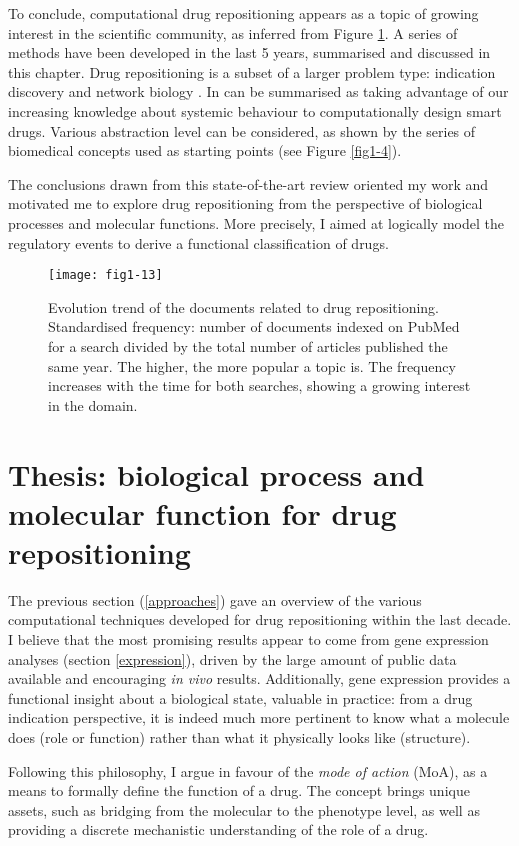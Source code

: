 To conclude, computational drug repositioning appears as a topic of growing interest in the scientific community, as inferred from Figure \ref{fig1-13}. A series of methods have been developed in the last 5 years, summarised and discussed in this chapter. Drug repositioning is a subset of a larger problem type: indication discovery and network biology \citep{hopkins2008network}. In can be summarised as taking advantage of our increasing knowledge about systemic behaviour to computationally design smart drugs.
Various abstraction level can be considered, as shown by the series of biomedical concepts used as starting points (see Figure \ref{fig1-4}).

The conclusions drawn from this state-of-the-art review oriented my work and motivated me to explore drug repositioning from the perspective of biological processes and molecular functions. More precisely, I aimed at logically model the regulatory events to derive a functional classification of drugs.

\begin{figure}[ht]
    \centering
    \texttt{[image: fig1-13]}
    \caption{Evolution trend of the documents related to drug repositioning. Standardised frequency: number of documents indexed on PubMed for a search divided by the total number of articles published the same year. The higher, the more popular a topic is. The  frequency increases with the time for both searches, showing a growing interest in the domain.}
    \label{fig1-13}
\end{figure}


\section{Thesis: biological process and molecular function for drug repositioning}

The previous section (\ref{approaches}) gave an overview of the various computational techniques developed for drug repositioning within the last decade. I believe that the most promising results appear to come from gene expression analyses (section \ref{expression}), driven by the large amount of public data available and encouraging \emph{in vivo} results. Additionally, gene expression provides a functional insight about a biological state, valuable in practice: from a drug indication perspective, it is indeed much more pertinent to know what a molecule does (role or function) rather than what it physically looks like (structure).

Following this philosophy, I argue in favour of the \emph{mode of action} (MoA), as a means to formally define the function of a drug. The concept brings unique assets, such as bridging from the molecular to the phenotype level, as well as providing a discrete mechanistic understanding of the role of a drug.

